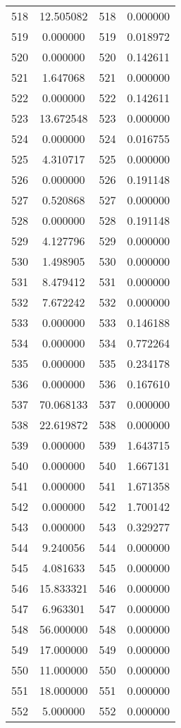 \documentclass[12pt]{article}
\begin{document}
\begin{longtable}{@{}cccc@{}}
518 & 12.505082 & 518 & 0.000000 \\
519 & 0.000000 & 519 & 0.018972 \\
520 & 0.000000 & 520 & 0.142611 \\
521 & 1.647068 & 521 & 0.000000 \\
522 & 0.000000 & 522 & 0.142611 \\
523 & 13.672548 & 523 & 0.000000 \\
524 & 0.000000 & 524 & 0.016755 \\
525 & 4.310717 & 525 & 0.000000 \\
526 & 0.000000 & 526 & 0.191148 \\
527 & 0.520868 & 527 & 0.000000 \\
528 & 0.000000 & 528 & 0.191148 \\
529 & 4.127796 & 529 & 0.000000 \\
530 & 1.498905 & 530 & 0.000000 \\
531 & 8.479412 & 531 & 0.000000 \\
532 & 7.672242 & 532 & 0.000000 \\
533 & 0.000000 & 533 & 0.146188 \\
534 & 0.000000 & 534 & 0.772264 \\
535 & 0.000000 & 535 & 0.234178 \\
536 & 0.000000 & 536 & 0.167610 \\
537 & 70.068133 & 537 & 0.000000 \\
538 & 22.619872 & 538 & 0.000000 \\
539 & 0.000000 & 539 & 1.643715 \\
540 & 0.000000 & 540 & 1.667131 \\
541 & 0.000000 & 541 & 1.671358 \\
542 & 0.000000 & 542 & 1.700142 \\
543 & 0.000000 & 543 & 0.329277 \\
544 & 9.240056 & 544 & 0.000000 \\
545 & 4.081633 & 545 & 0.000000 \\
546 & 15.833321 & 546 & 0.000000 \\
547 & 6.963301 & 547 & 0.000000 \\
548 & 56.000000 & 548 & 0.000000 \\
549 & 17.000000 & 549 & 0.000000 \\
550 & 11.000000 & 550 & 0.000000 \\
551 & 18.000000 & 551 & 0.000000 \\
552 & 5.000000 & 552 & 0.000000 \\

\end{longtable}
\end{document}
